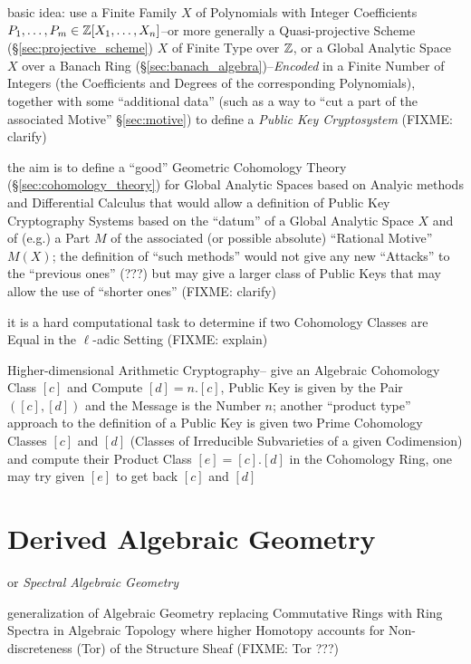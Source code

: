 basic idea: use a Finite Family $X$ of Polynomials with Integer Coefficients
$P_1, \ldots, P_m \in \mathbb{Z}[X_1, \ldots, X_n]$--or more generally a
Quasi-projective Scheme (\S\ref{sec:projective_scheme}) $X$ of Finite Type over
$\mathbb{Z}$, or a Global Analytic Space $X$ over a Banach Ring
(\S\ref{sec:banach_algebra})--\emph{Encoded} in a Finite Number of Integers
(the Coefficients and Degrees of the corresponding Polynomials), together with
some ``additional data'' (such as a way to ``cut a part of the associated
Motive'' \S\ref{sec:motive}) to define a \emph{Public Key Cryptosystem}
(FIXME: clarify)

the aim is to define a ``good'' Geometric Cohomology Theory
(\S\ref{sec:cohomology_theory}) for Global Analytic Spaces based on Analyic
methods and Differential Calculus that would allow a definition of Public Key
Cryptography Systems based on the ``datum'' of a Global Analytic Space $X$ and
of (e.g.) a Part $M$ of the associated (or possible absolute) ``Rational
Motive'' $M(X)$; the definition of ``such methods'' would not give any new
``Attacks'' to the ``previous ones'' (???) but may give a larger class of
Public Keys that may allow the use of ``shorter ones''
(FIXME: clarify)

it is a hard computational task to determine if two Cohomology Classes are
Equal in the $\ell$-adic Setting (FIXME: explain)

Higher-dimensional Arithmetic Cryptography-- give an Algebraic Cohomology Class
$[c]$ and Compute $[d] = n.[c]$, Public Key is given by the Pair $([c],[d])$
and the Message is the Number $n$; another ``product type'' approach to the
definition of a Public Key is given two Prime Cohomology Classes $[c]$ and
$[d]$ (Classes of Irreducible Subvarieties of a given Codimension) and compute
their Product Class $[e] = [c].[d]$ in the Cohomology Ring, one may try given
$[e]$ to get back $[c]$ and $[d]$



\section{Derived Algebraic Geometry}\label{sec:intersection_theory}

or \emph{Spectral Algebraic Geometry}

generalization of Algebraic Geometry replacing Commutative Rings with Ring
Spectra in Algebraic Topology where higher Homotopy accounts for
Non-discreteness (Tor) of the Structure Sheaf
(FIXME: Tor ???)

